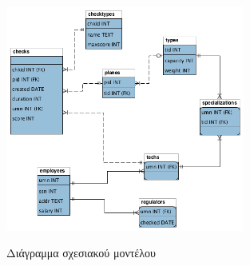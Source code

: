 \documentclass[a4paper]{article}
\begin{document}
\begin{figure}[h]
\centering
\includegraphics[width=0.7\textwidth]{../../R_model/r-db.png}\\
\caption{Διάγραμμα σχεσιακού μοντέλου}
\end{figure}


\end{document}
